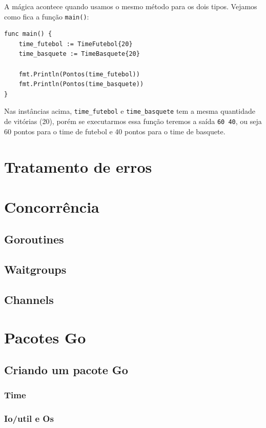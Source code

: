 \documentclass{SBCbookchapter}
\begin{document}
A mágica acontece quando usamos o mesmo método para os dois tipos. Vejamos como fica a função \texttt{main()}:

\begin{lstlisting}
func main() {
	time_futebol := TimeFutebol{20}
	time_basquete := TimeBasquete{20}
	
	fmt.Println(Pontos(time_futebol))
	fmt.Println(Pontos(time_basquete))
}
\end{lstlisting}

\label{duck}

Nas instâncias acima, \texttt{time\_futebol} e \texttt{time\_basquete} tem a mesma quantidade de vitórias (20), porém se executarmos essa função teremos a saída \texttt{60 40}, ou seja 60 pontos para o time de futebol e 40 pontos para o time de basquete.



\section{Tratamento de erros}

\section{Concorrência}
\subsection{Goroutines}
\subsection{Waitgroups}
\subsection{Channels}

\section{Pacotes Go}
\subsection{Criando um pacote Go}
\subsubsection{Time}
\subsubsection{Io/util e Os}
\end{document}
